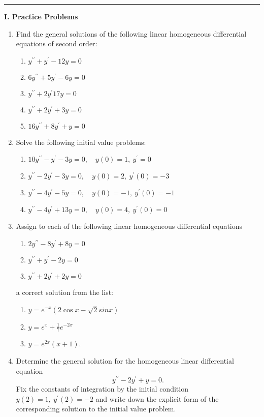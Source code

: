 \documentclass[11pt,a4paper,twoside]{article}
\begin{document}
	\rule{\textwidth}{0.4pt}
	\newpage
	\textbf{I. Practice Problems}\par
	\begin{enumerate}[\bfseries A.]
		\item Find the general solutions of the following linear homogeneous differential equations of second order:
		\begin{enumerate}[\bfseries 1)]
			\item $y^{\prime \prime} + y^\prime - 12y = 0$
			\item $6y^{\prime \prime} + 5y^\prime - 6y = 0$
			\item $y^{\prime \prime} + 2y^\prime 17y = 0$
			\item $y^{\prime \prime} + 2y^\prime + 3y = 0$
			\item $16y^{\prime \prime} + 8y^\prime + y = 0$
		\end{enumerate}
		\item Solve the following initial value problems:
		\begin{enumerate}[\bfseries 1)]
			\item $10y^{\prime \prime} - y^\prime - 3y = 0,\quad y(0) = 1,\ y^\prime = 0$
			\item $y^{\prime \prime} - 2y^\prime -3y = 0, \quad y(0) = 2,\ y^\prime(0) = -3$
			\item $y^{\prime \prime} - 4y^\prime -5y = 0, \quad y(0) = -1,\ y^\prime(0) = -1$
			\item $y^{\prime \prime} - 4y^\prime + 13y = 0, \quad y(0) = 4,\ y^\prime(0) = 0$
		\end{enumerate}
		\item Assign to each of the following linear homogeneous differential equations
		\begin{enumerate}[\bfseries 1)]
			\item $2y^{\prime \prime} - 8y^\prime + 8y = 0$
			\item $y^{\prime \prime} + y^\prime - 2y = 0$
			\item $y^{\prime \prime} + 2y^\prime + 2y = 0$
		\end{enumerate}
		a correct solution from the list:
		\begin{enumerate}[\bfseries i)]
			\item $y = e^{-x}(2\cos x - \sqrt{2}sin x)$
			\item $y = e^x + \frac{1}{7}e^{-2x}$
			\item $y = e^{2x}(x+1)$.
		\end{enumerate}
		\item Determine the general solution for the homogeneous linear differential equation
		$$
		y^{\prime \prime}-2y^\prime+y=0.
		$$
		Fix the constants of integration by the initial condition $y(2) = 1,\ y^\prime (2) = −2$ and write down the explicit form of the corresponding solution to the initial value problem.
	\end{enumerate}
\end{document}
